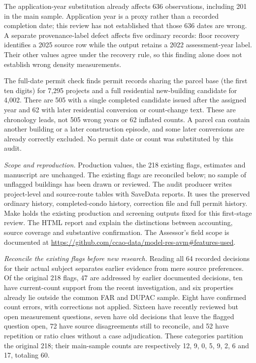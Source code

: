 The application-year substitution already affects 636 observations,
including 201 in the main sample. Application year is a proxy rather
than a recorded completion date; this review has not established that
those 636 dates are wrong. A separate provenance-label defect affects
five ordinary records: floor recovery identifies a 2025 source row
while the output retains a 2022 assessment-year label. Their other
values agree under the recovery rule, so this finding alone does not
establish wrong density measurements.

The full-date permit check finds permit records sharing the parcel base
(the first ten digits) for 7,295
projects and a full residential new-building candidate for 4,002.
There are 505 with a single completed candidate issued after the
assigned year and 62 with later residential conversion or count-change
text. These are chronology leads, not 505 wrong years or 62 inflated
counts. A parcel can contain another building or a later construction
episode, and some later conversions are already correctly excluded.
No permit date or count was substituted by this audit.

\textit{Scope and reproduction.} Production values, the 218 existing
flags, estimates and manuscript are unchanged. The existing flags are
reconciled below; no sample of unflagged buildings has been drawn or
reviewed. The audit producer
writes project-level and source-route tables with SaveData reports. It
uses the preserved ordinary history, completed-condo history, correction
file and full permit history. Make holds the existing production and
screening outputs fixed for this first-stage review. The HTML report
and  explain the distinctions between accounting,
source coverage and substantive confirmation. The Assessor's field
scope is documented at
\url{https://github.com/ccao-data/model-res-avm#features-used}.

\textit{Reconcile the existing flags before new research.} Reading all
64 recorded decisions for their actual subject separates earlier
evidence from mere source preferences. Of the original 218 flags, 47
are addressed by earlier documented decisions, ten have current-count
support from the recent investigation, and six properties already lie
outside the common FAR and DUPAC sample. Eight have confirmed count
errors, with corrections not applied. Sixteen have recently reviewed
but open measurement questions, seven have old decisions that leave
the flagged question open, 72 have source disagreements still to
reconcile, and 52 have repetition or ratio clues without a case
adjudication. These categories partition the original 218; their
main-sample counts are respectively 12, 9, 0, 5, 9, 2, 6 and 17,
totaling 60.

